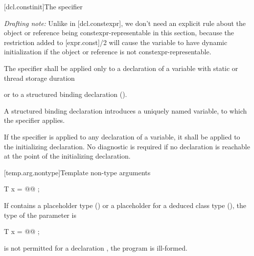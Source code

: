 \documentclass{wg21}
\begin{document}
[dcl.constinit]{The  specifier}

\emph{Drafting note:} Unlike in [dcl.constexpr], we don't need an explicit rule
about the object or reference being constexpr-representable in this section,
because the restriction added to [expr.const]/2 will cause the variable to have
dynamic initialization if the object or reference is not
constexpr-representable.


The  specifier shall be applied only to a declaration of a
variable with static or thread storage duration
\begin{addedblock}
or to a structured binding declaration ().
\begin{note}A structured binding declaration introduces a uniquely named variable, to which the  specifier applies. \end{note}
\end{addedblock}
If the specifier is applied to
any declaration of a variable, it shall be applied to the initializing
declaration. No diagnostic is required if no  declaration is
reachable at the point of the initializing declaration.

[temp.arg.nontype]{Template non-type arguments}


\begin{addedblock}
\begin{codeblock}
    T x = @@ ;
\end{codeblock}
\end{addedblock}
%
If   
contains a placeholder type ()
or a placeholder for a deduced class type (),
the type of the parameter is 
\begin{removedblock}
\begin{codeblock}
    T x = @@ ;
\end{codeblock}
\end{removedblock}
 is not permitted
for a  declaration ,
the program is ill-formed.
\end{document}
